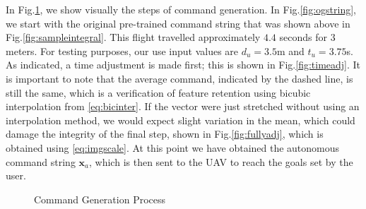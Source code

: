 \documentclass[letterpaper, 10 pt, conference]{ieeeconf}  %
\begin{document}
In Fig.\ref{fig:gensample}, we show visually the steps of command generation. In Fig.\ref{fig:ogstring}, we start with the original pre-trained command string that was shown above in Fig.\ref{fig:sampleintegral}. This flight travelled approximately $4.4$ seconds for $3$ meters. For testing purposes, our use input values are $d_u=3.5$m and $t_u=3.75$s. As indicated, a time adjustment is made first; this is shown in Fig.\ref{fig:timeadj}. It is important to note that the average command, indicated by the dashed line, is still the same, which is a verification of feature retention using bicubic interpolation from \eqref{eq:bicinter}. If the vector were just stretched without using an interpolation method, we would expect slight variation in the mean, which could damage the integrity of the final step, shown in Fig.\ref{fig:fullyadj}, which is obtained using \eqref{eq:imgscale}. At this point we have obtained the autonomous command string $\mathbf{x}_a$, which is then sent to the UAV to reach the goals set by the user.


\begin{figure}[h]
	\centering
	\caption{Command Generation Process}
	\label{fig:gensample}
\end{figure}
\end{document}
